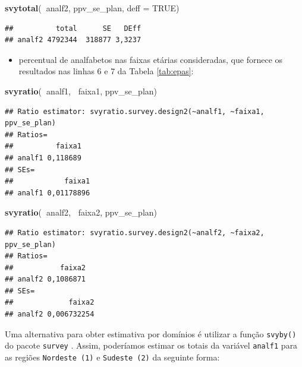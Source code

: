 \documentclass[]{book}
\newenvironment{Shaded}{\begin{snugshade}}{\end{snugshade}}
\newcommand{\KeywordTok}[1]{\textcolor[rgb]{0.13,0.29,0.53}{\textbf{#1}}}
\newcommand{\DataTypeTok}[1]{\textcolor[rgb]{0.13,0.29,0.53}{#1}}
\newcommand{\OtherTok}[1]{\textcolor[rgb]{0.56,0.35,0.01}{#1}}
\newcommand{\OperatorTok}[1]{\textcolor[rgb]{0.81,0.36,0.00}{\textbf{#1}}}
\newcommand{\NormalTok}[1]{#1}
\providecommand{\tightlist}{%
  \setlength{\itemsep}{0pt}\setlength{\parskip}{0pt}}
\theoremstyle{definition}
\theoremstyle{definition}
\theoremstyle{definition}
\theoremstyle{remark}
\begin{document}
\begin{Shaded}
\begin{Highlighting}[]
\KeywordTok{svytotal}\NormalTok{(}\OperatorTok{~}\NormalTok{analf2, ppv_se_plan, }\DataTypeTok{deff =} \OtherTok{TRUE}\NormalTok{)}
\end{Highlighting}
\end{Shaded}

\begin{verbatim}
##          total      SE   DEff
## analf2 4792344  318877 3,3237
\end{verbatim}

\begin{itemize}
\tightlist
\item
  percentual de analfabetos nas faixas etárias consideradas, que fornece
  os resultados nas linhas 6 e 7 da Tabela \ref{tab:epas}:
\end{itemize}

\begin{Shaded}
\begin{Highlighting}[]
\KeywordTok{svyratio}\NormalTok{(}\OperatorTok{~}\NormalTok{analf1, }\OperatorTok{~}\NormalTok{faixa1, ppv_se_plan)}
\end{Highlighting}
\end{Shaded}

\begin{verbatim}
## Ratio estimator: svyratio.survey.design2(~analf1, ~faixa1, ppv_se_plan)
## Ratios=
##          faixa1
## analf1 0,118689
## SEs=
##            faixa1
## analf1 0,01178896
\end{verbatim}

\begin{Shaded}
\begin{Highlighting}[]
\KeywordTok{svyratio}\NormalTok{(}\OperatorTok{~}\NormalTok{analf2, }\OperatorTok{~}\NormalTok{faixa2, ppv_se_plan)}
\end{Highlighting}
\end{Shaded}

\begin{verbatim}
## Ratio estimator: svyratio.survey.design2(~analf2, ~faixa2, ppv_se_plan)
## Ratios=
##           faixa2
## analf2 0,1086871
## SEs=
##             faixa2
## analf2 0,006732254
\end{verbatim}

Uma alternativa para obter estimativa por domínios é utilizar a função
\texttt{svyby()} do pacote \texttt{survey} \citep{R-survey}. Assim,
poderíamos estimar os totais da variável \texttt{analf1} para as regiões
\texttt{Nordeste\ (1)} e \texttt{Sudeste\ (2)} da seguinte forma:
\end{document}
